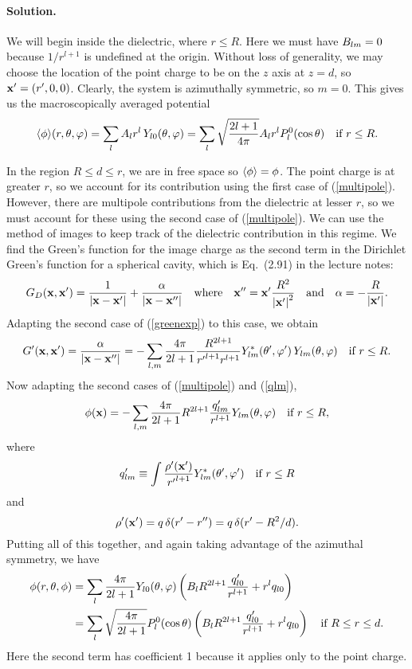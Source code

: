 \documentclass[11pt]{article}
\newcommand{\refeq}[1]{(\ref{#1})}
\newcommand{\beq}{\begin{equation*}}
\newcommand{\eeq}{\end{equation*}}
\newcommand{\beqn}{\begin{equation}}
\newcommand{\eeqn}{\end{equation}}
\newenvironment{solution}
{
    \paragraph{Solution.}
    \ignorespaces
}
{
    \bigskip
}
\begin{document}
\begin{solution}
	We will begin inside the dielectric, where $r \leq R$.  Here we must have $B_{l m} = 0$ because $1/r^{l+1}$ is undefined at the origin.  Without loss of generality, we may choose the location of the point charge to be on the $z$ axis at $z = d$, so $\vb{x}' = (r', 0, 0)$.  Clearly, the system is azimuthally symmetric, so $m = 0$.  This gives us the macroscopically averaged potential
	\beqn \label{inside}
		\evphi\!(r, \tht, \vph) = \sum_{l} \Al r^l \, Y_{l 0}\tv
		= \sum_{l} \sqrt{\frac{2l + 1}{4\pi}} \Al r^l \Ploct \quad \tif r \leq R.
	\eeqn
	
	In the region $R \leq d \leq r$, we are in free space so $\evphi = \phi$.  The point charge is at greater $r$, so we account for its contribution using the first case of \refeq{multipole}.  However, there are multipole contributions from the dielectric at lesser $r$, so we must account for these using the second case of \refeq{multipole}.  We can use the method of images to keep track of the dielectric contribution in this regime.  We find the Green's function for the image charge as the second term in the Dirichlet Green's function for a spherical cavity, which is Eq.~(2.91) in the lecture notes:
	\beq
		\Gdxxp = \frac{1}{\abs{\vx - \vx'}} + \frac{\alp}{\abs{\vx - \vx''}}
		\qq{where} \vx'' = \vx' \frac{R^2}{\abs{\vx'}^2}
		\qand \alp = -\frac{R}{\abs{\vx'}}.
	\eeq
	Adapting the second case of \refeq{greenexp} to this case, we obtain
	\beq
		\Gpxxp = \frac{\alp}{\abs{\vx - \vx''}}
		= -\sum_{l,m} \frac{4\pi}{2l + 1} \frac{R^{2l+1}}{{r'}^{l+1} r^{l + 1}} \Ylm^*\tvp \, \Ylm\tv \quad \tif r \leq R.
	\eeq
	Now adapting the second cases of \refeq{multipole} and \refeq{qlm},
	\beq
		\phix = -\sum_{l,m} \frac{4\pi}{2l+1} R^{2l+1} \frac{\qplm}{r^{l+1}} \Ylm\tv \quad \tif r \leq R,
	\eeq
	where
	\beq
		\qplm \equiv \int \frac{\rhopxp}{{r'}^{l+1}} \Ylm^*\tvp \quad \tif r \leq R
	\eeq
	and
	\beq
		\rhopxp = q \, \delta(r' - r'')
		= q \, \delta(r' - R^2 / d).
	\eeq
	Putting all of this together, and again taking advantage of the azimuthal symmetry, we have
	\begin{align}
		\phi(r, \theta, \phi) &= \sum_{l} \frac{4\pi}{2l+1} Y_{l 0}(\theta, \varphi) \left( B_l R^{2l+1} \frac{q'_{l 0}}{r^{l+1}} + r^l q_{l 0} \right) \notag \\
		&= \sum_{l} \sqrt{\frac{4\pi}{2l+1}} P_l^0(\cos\theta) \left( B_l R^{2l+1} \frac{q'_{l 0}}{r^{l+1}} + r^l q_{l 0} \right) \quad \text{if } R \leq r \leq d. \label{middle}
	\end{align}
	Here the second term has coefficient 1 because it applies only to the point charge.
	

\end{solution}
\end{document}
